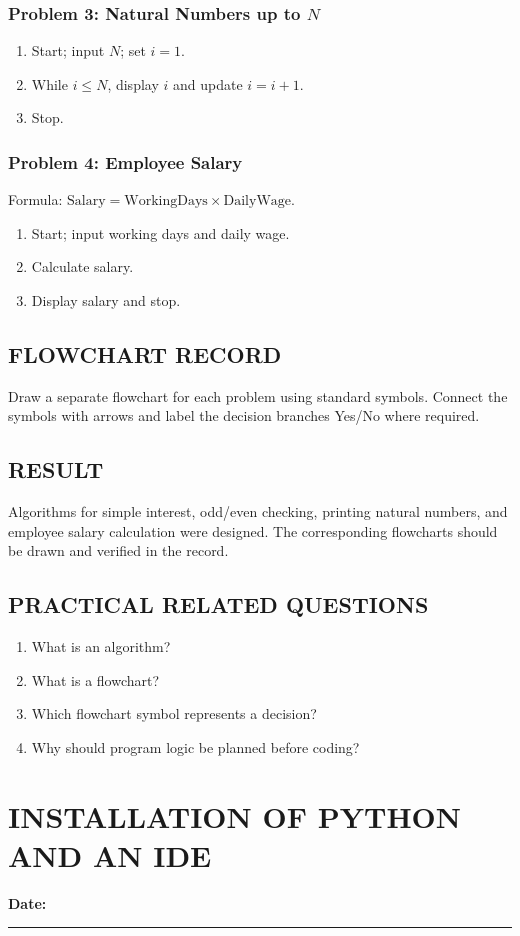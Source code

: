 \documentclass[12pt,a4paper]{report}
\newcommand{\experimentdate}{\hfill\textbf{Date:} \rule{3cm}{0.4pt}}
\newcommand{\result}[1]{\section*{RESULT}#1}
\newcommand{\questions}[1]{\section*{PRACTICAL RELATED QUESTIONS}#1}
\begin{document}
\subsection*{Problem 3: Natural Numbers up to \(N\)}
\begin{enumerate}
\item Start; input \(N\); set \(i=1\).
\item While \(i\leq N\), display \(i\) and update \(i=i+1\).
\item Stop.
\end{enumerate}
\subsection*{Problem 4: Employee Salary}
Formula: \(\mathrm{Salary}=\mathrm{WorkingDays}\times\mathrm{DailyWage}\).
\begin{enumerate}
\item Start; input working days and daily wage.
\item Calculate salary.
\item Display salary and stop.
\end{enumerate}

\section*{FLOWCHART RECORD}
Draw a separate flowchart for each problem using standard symbols. Connect the symbols with arrows and label the decision branches Yes/No where required.

\result{Algorithms for simple interest, odd/even checking, printing natural numbers, and employee salary calculation were designed. The corresponding flowcharts should be drawn and verified in the record.}

\questions{
\begin{enumerate}
\item What is an algorithm?
\item What is a flowchart?
\item Which flowchart symbol represents a decision?
\item Why should program logic be planned before coding?
\end{enumerate}}

\chapter{INSTALLATION OF PYTHON AND AN IDE}
\experimentdate
\end{document}
